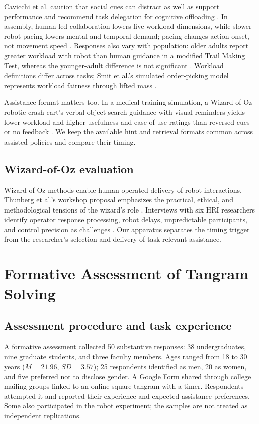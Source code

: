 \documentclass[sigconf,anonymous]{aamas}
\begin{document}
Cavicchi et al. caution that social cues can distract as well as support performance and recommend task delegation for cognitive offloading \cite{cavicchi2025}. In assembly, human-led collaboration lowers five workload dimensions, while slower robot pacing lowers mental and temporal demand; pacing changes action onset, not movement speed \cite{vandijk2023}. Responses also vary with population: older adults report greater workload with robot than human guidance in a modified Trail Making Test, whereas the younger-adult difference is not significant \cite{varrasi2026}. Workload definitions differ across tasks; Smit et al.'s simulated order-picking model represents workload fairness through lifted mass \cite{smit2024}.

Assistance format matters too. In a medical-training simulation, a Wizard-of-Oz robotic crash cart's verbal object-search guidance with visual reminders yields lower workload and higher usefulness and ease-of-use ratings than reversed cues or no feedback \cite{tanjim2025}. We keep the available hint and retrieval formats common across assisted policies and compare their timing.

\subsection{Wizard-of-Oz evaluation}

Wizard-of-Oz methods enable human-operated delivery of robot interactions. Thunberg et al.'s workshop proposal emphasizes the practical, ethical, and methodological tensions of the wizard's role \cite{thunberg2026}. Interviews with six HRI researchers identify operator response processing, robot delays, unpredictable participants, and control precision as challenges \cite{bejarano2024}. Our apparatus separates the timing trigger from the researcher's selection and delivery of task-relevant assistance.

\section{Formative Assessment of Tangram Solving}

\subsection{Assessment procedure and task experience}
A formative assessment collected 50 substantive responses: 38 undergraduates, nine graduate students, and three faculty members. Ages ranged from 18 to 30 years ($M=21.96$, $SD=3.57$); 25 respondents identified as men, 20 as women, and five preferred not to disclose gender. A Google Form shared through college mailing groups linked to an online square tangram with a timer. Respondents attempted it and reported their experience and expected assistance preferences. Some also participated in the robot experiment; the samples are not treated as independent replications.
\end{document}
